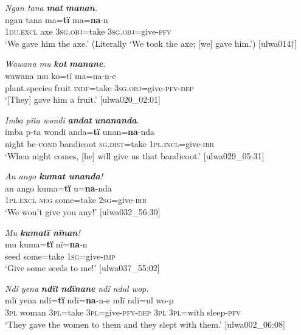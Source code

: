 \ea%
    \label{ex:clause:35}
          \textit{Ngan tana} \textbf{\textit{mat}} \textbf{\textit{manan}}.\\
\gll ngan    tana  ma=\textbf{tï}      ma=\textbf{na}{}-n\\
    1\textsc{du.excl}  axe    \textsc{3sg.obj}=take  3\textsc{sg.obj}=give-\textsc{pfv}\\
\glt `We gave him the axe.’ (Literally ‘We took the axe; [we] gave him.’) [ulwa014†]
\z

\newpage

\ea%
    \label{ex:clause:36}
          \textit{Wawana mu} \textbf{\textit{kot}} \textbf{\textit{manane}}.\\
\gll wawana  mu    ko=tï    ma=na-n-e\\
    plant.species  fruit  \textsc{indf}=take  \textsc{3sg.obj}=give-\textsc{pfv-dep}\\
\glt `[They] gave him a fruit.’ [ulwa020\_02:01]
\z

\ea%
    \label{ex:clause:37}
          \textit{Imba pïta wondi} \textbf{\textit{andat}} \textbf{\textit{unananda}}.\\
\gll imba  p-ta    wondi    anda=\textbf{tï}    unan=\textbf{na}{}-nda\\
    night  be-\textsc{cond}  bandicoot  \textsc{sg.dist}=take  1\textsc{pl.incl}=give-\textsc{irr}\\
\glt `When night comes, [he] will give us that bandicoot.’ [ulwa029\_05:31]
\z

\ea%
    \label{ex:clause:38}
          \textit{An ango \textbf{kumat unanda}!}\\
\gll    an      ango  kuma=\textbf{tï}  u=\textbf{na}{}-nda\\
    1\textsc{pl.excl}  \textsc{neg}  some=take  \textsc{2sg}=give-\textsc{irr}\\
\glt `We won’t give you any!’ [ulwa032\_56:30]
\z

\ea%
    \label{ex:clause:39}
          \textit{Mu \textbf{kumatï nïnan}!}\\
\gll    mu    kuma=\textbf{tï}  nï=\textbf{na}{}-n\\
    seed  some=take  1\textsc{sg}=give-\textsc{imp}\\
\glt `Give some seeds to me!’ [ulwa037\_55:02]
\z

\ea%
    \label{ex:clause:40}
          \textit{Ndï yena} \textbf{\textit{ndït}} \textbf{\textit{ndïnane}} \textit{ndï ndul wop.}\\
\gll    ndï  yena  ndï=\textbf{tï}    ndï=\textbf{na}{}-n-e    ndï  ndï=ul    wo-p\\
    3\textsc{pl}  woman  \textsc{3pl}=take  \textsc{3pl}=give-\textsc{pfv-dep}  \textsc{3pl}  3\textsc{pl}=with  sleep-\textsc{pfv}\\
\glt `They gave the women to them and they slept with them.’ [ulwa002\_06:08]
\z

